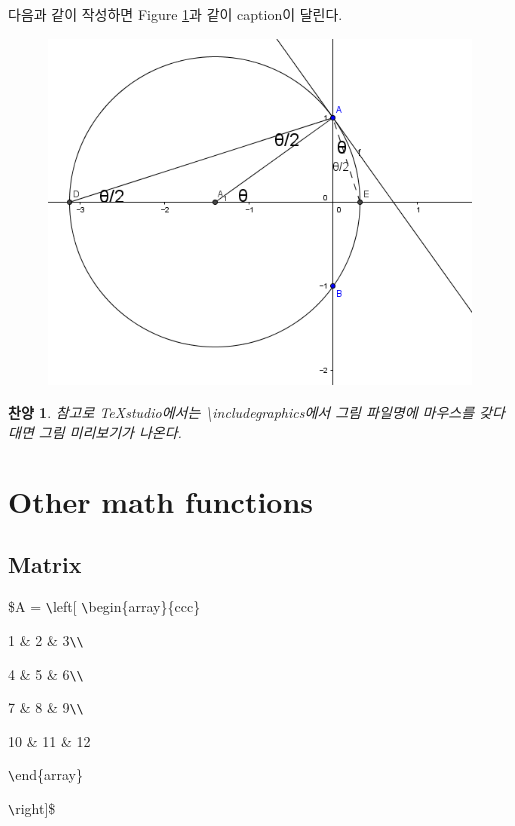 \documentclass[11pt]{article}
\newtheorem{praise}{찬양}
\begin{document}
다음과 같이 작성하면 Figure \ref{ding_2}과 같이 caption이 달린다.
\begin{figure}
	\begin{center}
		\includegraphics[scale=0.4]{2.png}
		\captionsetup{width=0.6\textwidth}
		\caption{\ding}
		\label{ding_2}
	\end{center}
\end{figure}

\begin{praise}
	참고로 TeXstudio에서는 \textbackslash includegraphics에서 그림 파일명에 마우스를 갖다대면 그림 미리보기가 나온다.
\end{praise}
\longline

\section{Other math functions}
\subsection{Matrix}

\$A = \verb+\+left[ \verb+\+begin\{array\}\{ccc\}

1 \& 2 \& 3\verb+\+\verb+\+

4 \& 5 \& 6\verb+\+\verb+\+

7 \& 8 \& 9\verb+\+\verb+\+

10 \& 11 \& 12

\verb+\+end\{array\}

\verb+\+right]\$
\end{document}
